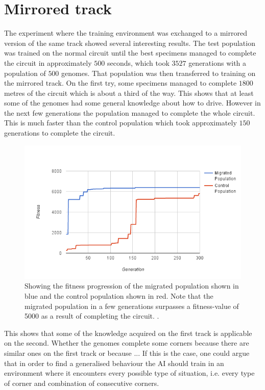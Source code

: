 

\section{Mirrored track}

The experiment where the training environment was exchanged to a mirrored version of the same track showed several interesting results. The test population was trained on the normal circuit until the best specimens managed to complete the circuit in approximately $500$ seconds, which took $3527$ generations with a population of $500$ genomes. That population was then transferred to training on the mirrored track. On the first try, some specimens managed to complete $1800$ metres of the circuit which is about a third of the way. This shows that at least some of the genomes had some general knowledge about how to drive. However in the next few generations the population managed to complete the whole circuit. This is much faster than the control population which took approximately $150$ generations to complete the circuit. 


\begin{figure}[H]
\includegraphics[width=\textwidth]{report/images/graphs/mirror_migration}
\centering
\caption{Showing the fitness progression of the migrated population shown in blue and the control population shown in red. Note that the migrated population in a few generations surpasses a fitness-value of 5000 as a result of completing the circuit. . }
\label{fig:mirrordata}
\end{figure}

This shows that some of the knowledge acquired on the first track is applicable on the second. Whether the genomes complete some corners because there are similar ones on the first track or because ... If this is the case, one could argue that in order to find a generalised behaviour the AI should train in an environment where it encounters every possible type of situation, i.e. every type of corner and combination of consecutive corners. 

